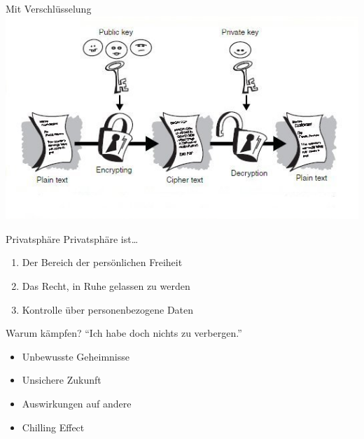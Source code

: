 \documentclass[aspectratio=1610]{beamer}
\begin{document}
  \begin{frame}{Mit Verschlüsselung}
    \includegraphics[width=\textwidth]{encryption.jpg}
  \end{frame}

  \begin{frame}{Privatsphäre}
    Privatsphäre ist…
    \begin{enumerate}
      \pause
      \item Der Bereich der persönlichen Freiheit
      \pause
      \item Das Recht, in Ruhe gelassen zu werden
      \pause
      \item Kontrolle über personenbezogene Daten
    \end{enumerate}
  \end{frame}

  \begin{frame}{Warum kämpfen?}
    “Ich habe doch nichts zu verbergen.”
    \pause
    \begin{itemize}
      \item Unbewusste Geheimnisse
      \item Unsichere Zukunft
      \item Auswirkungen auf andere
      \item Chilling Effect
    \end{itemize}
  \end{frame}
\end{document}
